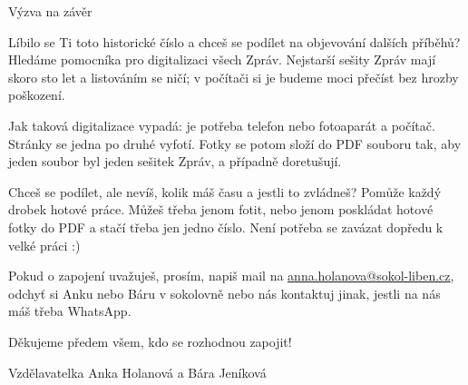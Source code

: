 Výzva na závěr

Líbilo se Ti toto historické číslo a chceš se podílet na objevování
dalších příběhů? Hledáme pomocníka pro digitalizaci všech Zpráv.
Nejstarší sešity Zpráv mají skoro sto let a listováním se ničí; v
počítači si je budeme moci přečíst bez hrozby poškození.

Jak taková digitalizace vypadá: je potřeba telefon nebo fotoaparát a
počítač. Stránky se jedna po druhé vyfotí. Fotky se potom složí do PDF
souboru tak, aby jeden soubor byl jeden sešitek Zpráv, a případně
doretušují.

Chceš se podílet, ale nevíš, kolik máš času a jestli to zvládneš? Pomůže
každý drobek hotové práce. Můžeš třeba jenom fotit, nebo jenom poskládat
hotové fotky do PDF a stačí třeba jen jedno číslo. Není potřeba se
zavázat dopředu k velké práci :)

Pokud o zapojení uvažuješ, prosím, napiš mail na
\href{mailto:anna.holanova@sokol-liben.cz}{\ul{anna.holanova@sokol-liben.cz}},
odchyť si Anku nebo Báru v sokolovně nebo nás kontaktuj jinak, jestli na
nás máš třeba WhatsApp.

Děkujeme předem všem, kdo se rozhodnou zapojit!

Vzdělavatelka Anka Holanová a Bára Jeníková
